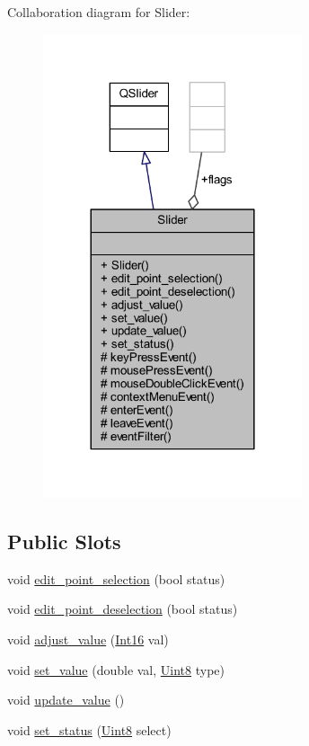 Collaboration diagram for Slider\+:
\nopagebreak
\begin{figure}[H]
\begin{center}
\leavevmode
\includegraphics[width=216pt]{d5/d0f/a00308}
\end{center}
\end{figure}
\subsection*{Public Slots}
\begin{DoxyCompactItemize}
\item 
void \hyperlink{a00024_adeebaace74ff3add2acd9147e96fc0a6}{edit\+\_\+point\+\_\+selection} (bool status)
\item 
void \hyperlink{a00024_a105dff1f3ae7cfdcfabacd013428a501}{edit\+\_\+point\+\_\+deselection} (bool status)
\item 
void \hyperlink{a00024_a521ac5143857dd652a0bafa77389fa81}{adjust\+\_\+value} (\hyperlink{a00001_a3985266aecb120f269789241c170850c}{Int16} val)
\item 
void \hyperlink{a00024_ae3010d3de02715db2f443560d7d2a27b}{set\+\_\+value} (double val, \hyperlink{a00001_a979e3e23b9a449e69ab6a8a83b6042f8}{Uint8} type)
\item 
void \hyperlink{a00024_a4f62a01554ee8d975abe0cb136937695}{update\+\_\+value} ()
\item 
void \hyperlink{a00024_a567902754e43310fe921b74c9d1862dd}{set\+\_\+status} (\hyperlink{a00001_a979e3e23b9a449e69ab6a8a83b6042f8}{Uint8} select)
\end{DoxyCompactItemize}
